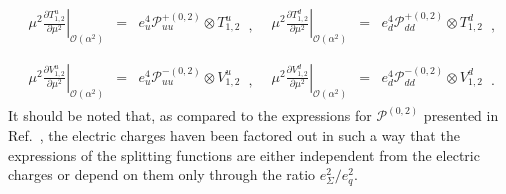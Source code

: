\begin{equation}
\begin{array}{ll}
\begin{array}{rcl}
\displaystyle \left.\mu^2\frac{\partial T^u_{1,2}}{\partial \mu^2}\right|_{\mathcal{O}(\alpha^2)} &=&
\displaystyle e_u^4\mathcal{P}_{uu}^{+(0,2)}\otimes T^u_{1,2}
\end{array}\,, &
\begin{array}{rcl}
\displaystyle \left.\mu^2\frac{\partial T^d_{1,2}}{\partial \mu^2}\right|_{\mathcal{O}(\alpha^2)} &=&
\displaystyle e_d^4\mathcal{P}_{dd}^{+(0,2)} \otimes T^d_{1,2}
\end{array}\,,
\\
\\
\begin{array}{rcl}
\displaystyle \left.\mu^2\frac{\partial V^u_{1,2}}{\partial \mu^2}\right|_{\mathcal{O}(\alpha^2)} &=&
\displaystyle e_u^4\mathcal{P}_{uu}^{-(0,2)} \otimes V^u_{1,2}
\end{array}\,, &
\begin{array}{rcl}
\displaystyle \left.\mu^2\frac{\partial V^d_{1,2}}{\partial \mu^2}\right|_{\mathcal{O}(\alpha^2)} &=&
\displaystyle e_d^4\mathcal{P}_{dd}^{-(0,2)}\otimes V^d_{1,2}
\end{array}\,.
\end{array}
\end{equation}
It should be noted that, as compared to the expressions for
$\mathcal{P}^{(0,2)}$ presented in Ref.~\cite{deFlorian:2016gvk},
the electric charges haven been factored out in such a way that the
expressions of the splitting functions are either independent from the
electric charges or depend on them only through the ratio
$e_\Sigma^2/e_q^2$.
%

